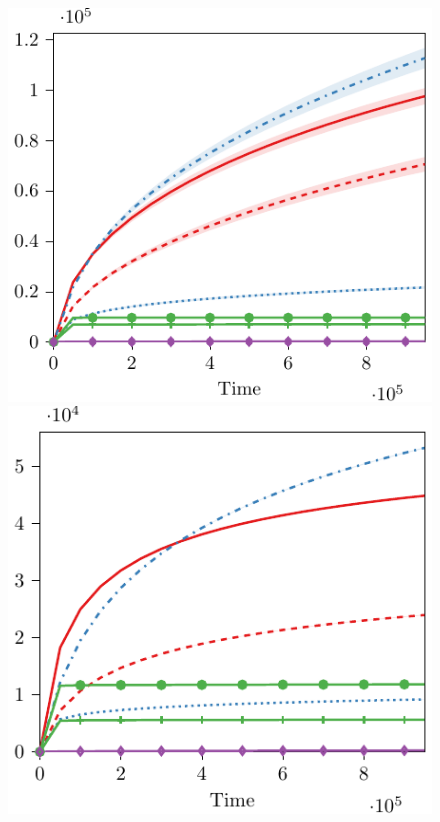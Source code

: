 \begin{figure}
\begin{minipage}{0.25\linewidth}
    \includegraphics[width=0.85\linewidth]{images/attack_reward/jester/cost_attack_reward_jester.pdf}
    \end{minipage}\hfill
    \begin{minipage}{0.25\linewidth}
    \centering
    \includegraphics[width=0.85\linewidth]{images/attack_reward/movielens/cost_reward_attack_movielens.pdf}
    \end{minipage}\\
    \begin{minipage}{0.25\linewidth}
        \centering

\end{minipage}
\end{figure}
